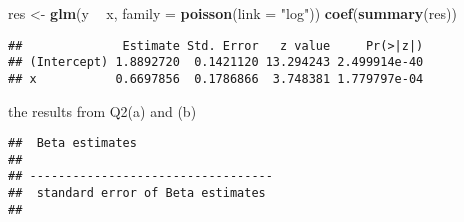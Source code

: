 \documentclass[]{article}
\newenvironment{Shaded}{\begin{snugshade}}{\end{snugshade}}
\newcommand{\KeywordTok}[1]{\textcolor[rgb]{0.13,0.29,0.53}{\textbf{#1}}}
\newcommand{\DataTypeTok}[1]{\textcolor[rgb]{0.13,0.29,0.53}{#1}}
\newcommand{\FloatTok}[1]{\textcolor[rgb]{0.00,0.00,0.81}{#1}}
\newcommand{\CharTok}[1]{\textcolor[rgb]{0.31,0.60,0.02}{#1}}
\newcommand{\StringTok}[1]{\textcolor[rgb]{0.31,0.60,0.02}{#1}}
\newcommand{\CommentTok}[1]{\textcolor[rgb]{0.56,0.35,0.01}{\textit{#1}}}
\newcommand{\OperatorTok}[1]{\textcolor[rgb]{0.81,0.36,0.00}{\textbf{#1}}}
\newcommand{\NormalTok}[1]{#1}
\begin{document}
\begin{Shaded}
\begin{Highlighting}[]
\NormalTok{res <-}\StringTok{ }\KeywordTok{glm}\NormalTok{(y }\OperatorTok{~}\StringTok{ }\NormalTok{x, }\DataTypeTok{family =} \KeywordTok{poisson}\NormalTok{(}\DataTypeTok{link =} \StringTok{"log"}\NormalTok{))}
\KeywordTok{coef}\NormalTok{(}\KeywordTok{summary}\NormalTok{(res))}
\end{Highlighting}
\end{Shaded}

\begin{verbatim}
##              Estimate Std. Error   z value     Pr(>|z|)
## (Intercept) 1.8892720  0.1421120 13.294243 2.499914e-40
## x           0.6697856  0.1786866  3.748381 1.779797e-04
\end{verbatim}

the results from Q2(a) and (b)

\begin{Shaded}
\end{Shaded}

\begin{verbatim}
##  Beta estimates
##  
## ----------------------------------
##  standard error of Beta estimates
## 
\end{verbatim}
\end{document}
